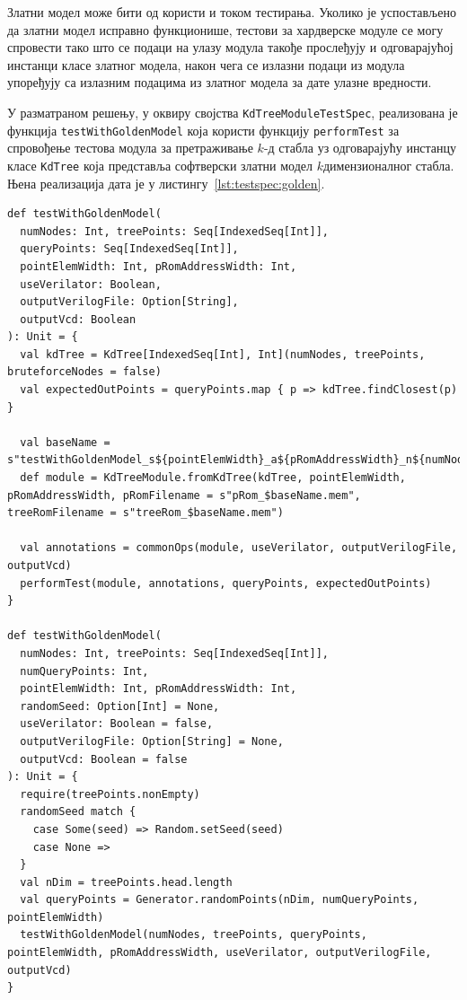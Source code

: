 \documentclass[master]{finthesis}
\newcommand*{\kdim}[1]{\texorpdfstring{$k$\Hyphdash}{k-}димензионал#1}
\newcommand*{\kd}{\texorpdfstring{$k$}{k}-д }
\newcommand*{\prog}[1]{\texttt{#1}}
\newcommand*{\func}[1]{\prog{#1}}
\begin{document}
Златни модел може бити од користи и током тестирања. Уколико је успостављено да златни модел исправно функционише, тестови за хардверске модуле се могу спровести тако што се подаци на улазу модула такође прослеђују и одговарајућој инстанци класе златног модела, након чега се излазни подаци из модула упоређују са излазним подацима из златног модела за дате улазне вредности.

У разматраном решењу, у оквиру својства \prog{KdTreeModuleTestSpec}, реализована је функција \func{testWithGoldenModel} која користи функцију \func{performTest} за спровођење тестова модула за претраживање \kd стабла уз одговарајућу инстанцу класе \prog{KdTree} која представља софтверски златни модел \kdim{ног} стабла. Њена реализација дата је у листингу~\ref{lst:testspec:golden}.

\begin{lstlisting}[style=Chisel, caption={Реализација функције \func{testWithGoldenModel}.}, label={lst:testspec:golden}]
def testWithGoldenModel(
  numNodes: Int, treePoints: Seq[IndexedSeq[Int]],
  queryPoints: Seq[IndexedSeq[Int]],
  pointElemWidth: Int, pRomAddressWidth: Int,
  useVerilator: Boolean,
  outputVerilogFile: Option[String],
  outputVcd: Boolean
): Unit = {
  val kdTree = KdTree[IndexedSeq[Int], Int](numNodes, treePoints, bruteforceNodes = false)
  val expectedOutPoints = queryPoints.map { p => kdTree.findClosest(p) }

  val baseName = s"testWithGoldenModel_s${pointElemWidth}_a${pRomAddressWidth}_n${numNodes}_p${treePoints.length}_q${queryPoints.length}"
  def module = KdTreeModule.fromKdTree(kdTree, pointElemWidth, pRomAddressWidth, pRomFilename = s"pRom_$baseName.mem", treeRomFilename = s"treeRom_$baseName.mem")

  val annotations = commonOps(module, useVerilator, outputVerilogFile, outputVcd)
  performTest(module, annotations, queryPoints, expectedOutPoints)
}

def testWithGoldenModel(
  numNodes: Int, treePoints: Seq[IndexedSeq[Int]],
  numQueryPoints: Int,
  pointElemWidth: Int, pRomAddressWidth: Int,
  randomSeed: Option[Int] = None,
  useVerilator: Boolean = false,
  outputVerilogFile: Option[String] = None,
  outputVcd: Boolean = false
): Unit = {
  require(treePoints.nonEmpty)
  randomSeed match {
    case Some(seed) => Random.setSeed(seed)
    case None =>
  }
  val nDim = treePoints.head.length
  val queryPoints = Generator.randomPoints(nDim, numQueryPoints, pointElemWidth)
  testWithGoldenModel(numNodes, treePoints, queryPoints, pointElemWidth, pRomAddressWidth, useVerilator, outputVerilogFile, outputVcd)
}
\end{lstlisting}
\end{document}
